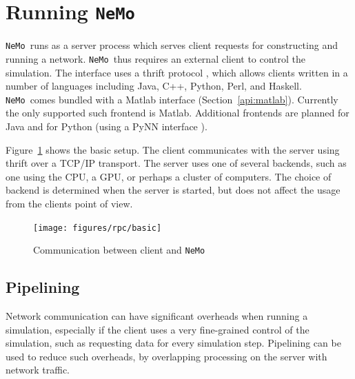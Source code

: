 \documentclass[a4paper]{article}
\newcommand{\nemo}{\texttt{NeMo}}
\begin{document}


\section{Running \nemo}

\nemo\ runs as a server process which serves client requests for constructing and running a network. 
\nemo\ thus requires an external client to control the simulation.
The interface uses a thrift protocol \cite{slee07thrift},
	which allows clients written in a number of languages including 
		Java,
		C++,
		Python,
		Perl, and 
		Haskell.
\nemo\ comes bundled with a Matlab interface (Section~\ref{api:matlab}).
Currently the only supported such frontend is Matlab.
Additional frontends are planned for Java and for Python (using a PyNN interface \cite{davison08pynn}). 


Figure~\ref{fig:rpc:basic} shows the basic setup.
The client communicates with the server using thrift over a TCP/IP transport.
The server uses one of several backends,
	such as one using the CPU, a GPU, or perhaps a cluster of computers.
The choice of backend is determined when the server is started,
	but does not affect the usage from the clients point of view.

\begin{figure}
	\texttt{[image: figures/rpc/basic]}
	\caption{Communication between client and \nemo} 
	\label{fig:rpc:basic}
\end{figure}


\subsection{Pipelining}

Network communication can have significant overheads when running a simulation,
	especially if the client uses a very fine-grained control of the simulation,
	such as requesting data for every simulation step.
Pipelining can be used to reduce such overheads,
	by overlapping processing on the server with network traffic. 
\end{document}
